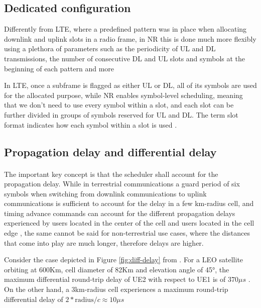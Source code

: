 \subsection{Dedicated configuration}
Differently from LTE, where a predefined pattern was in place when allocating downlink and uplink slots in a radio frame, in \ac{NR} this is done much more flexibly using a plethora of parameters such as the periodicity of UL and DL transmissions, the number of consecutive DL and UL slots and symbols at the beginning of each pattern and more \cite{5g-sched-sharetechnote}

In LTE, once a subframe is flagged as either UL or DL, all of its symbols are used for the allocated purpose, while \ac{NR} enables symbol-level scheduling, meaning that we don't need to use every symbol within a slot, and each slot can be further divided in groups of symbols reserved for UL and DL. The term slot format indicates how each symbol within a slot is used \cite{frame-5gnet}. 


\subsection{Propagation delay and differential delay}
\paragraph{}The important key concept is that the scheduler shall account for the propagation delay. While in terrestrial communications a guard period of six symbols when switching from downlink communications to uplink communications is sufficient to account for the delay in a few km-radius cell, and timing advance commands can account for the different propagation delays experienced by users located in the center of the cell and users located in the cell edge \cite{gsma-5g-tdd-sync}, the same cannot be said for non-terrestrial use cases, where the distances that come into play are much longer, therefore delays are higher.

Consider the case depicted in Figure \ref{fig:diff-delay} from \cite{preamble-detection-chougrani}. For a \ac{LEO} satellite orbiting at 600Km, cell diameter of 82Km and elevation angle of 45°, the maximum differential round-trip delay of UE2 with respect to UE1 is of $370\mu s$ \cite{preamble-detection-chougrani}. On the other hand, a 3km-radius cell experiences a maximum round-trip differential delay of $2*\text{radius}/c \approx 10\mu s$

